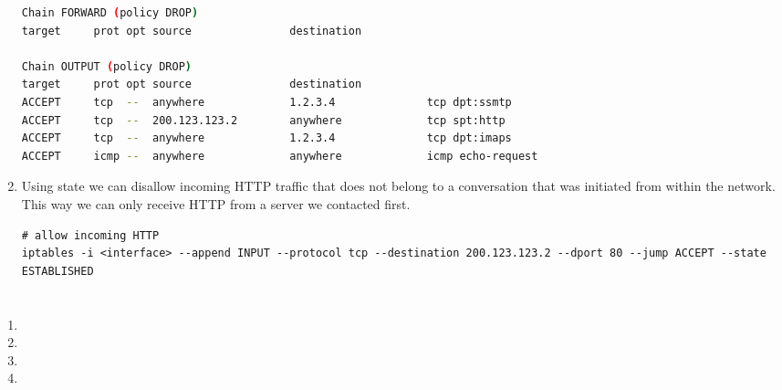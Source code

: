 \documentclass[12pt, a4paper]{article}
\begin{document}
\begin{enumerate}[a]
\begin{lstlisting}[language=bash]
Chain FORWARD (policy DROP)
target     prot opt source               destination

Chain OUTPUT (policy DROP)
target     prot opt source               destination
ACCEPT     tcp  --  anywhere             1.2.3.4              tcp dpt:ssmtp
ACCEPT     tcp  --  200.123.123.2        anywhere             tcp spt:http
ACCEPT     tcp  --  anywhere             1.2.3.4              tcp dpt:imaps
ACCEPT     icmp --  anywhere             anywhere             icmp echo-request
	\end{lstlisting}
	\item %
	Using state we can disallow incoming HTTP traffic that does not belong to a conversation that was initiated from within the network. This way we can only receive HTTP from a server we contacted first.

	\begin{lstlisting}
# allow incoming HTTP
iptables -i <interface> --append INPUT --protocol tcp --destination 200.123.123.2 --dport 80 --jump ACCEPT --state ESTABLISHED
	\end{lstlisting}
\end{enumerate}

\section{} %

\section{} %
\begin{enumerate}[a]
	\item %
	\item %
	\item %
	\item %
\end{enumerate}
\end{document}
